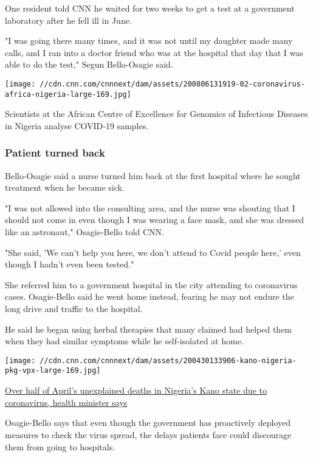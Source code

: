 One resident told CNN he waited for two weeks to get a test at a
government laboratory after he fell ill in June.

"I was going there many times, and it was not until my daughter made
many calls, and I ran into a doctor friend who was at the hospital that
day that I was able to do the test," Segun Bello-Osagie said.

\texttt{[image: //cdn.cnn.com/cnnnext/dam/assets/200806131919-02-coronavirus-africa-nigeria-large-169.jpg]}

Scientists at the African Centre of Excellence for Genomics of
Infectious Diseases in Nigeria analyse COVID-19 samples.

\hypertarget{patient-turned-back}{%
\subsubsection{Patient turned back}\label{patient-turned-back}}

Bello-Osagie said a nurse turned him back at the first hospital where he
sought treatment when he became sick.

"I was not allowed into the consulting area, and the nurse was shouting
that I should not come in even though I was wearing a face mask, and she
was dressed like an astronaut," Osagie-Bello told CNN.

"She said, 'We can't help you here, we don't attend to Covid people
here,' even though I hadn't even been tested."

She referred him to a government hospital in the city attending to
coronavirus cases. Osagie-Bello said he went home instead, fearing he
may not endure the long drive and traffic to the hospital.

He said he began using herbal therapies that many claimed had helped
them when they had similar symptoms while he self-isolated at home.

\href{/2020/06/09/africa/nigeria-spike-in-deaths-covid/index.html}{}

\texttt{[image: //cdn.cnn.com/cnnnext/dam/assets/200430133906-kano-nigeria-pkg-vpx-large-169.jpg]}

\href{/2020/06/09/africa/nigeria-spike-in-deaths-covid/index.html}{Over
half of April's unexplained deaths in Nigeria's Kano state due to
coronavirus, health minister says}

Osagie-Bello says that even though the government has proactively
deployed measures to check the virus spread, the delays patients face
could discourage them from going to hospitals.

